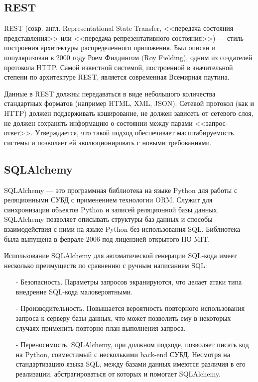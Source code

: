 \subsection{REST}

REST (сокр. англ. Representational State Transfer, <<передача состояния представления>> или <<передача репрезентативного состояния>>) --- стиль построения архитектуры распределенного приложения. 
Был описан и популяризован в 2000 году Роем Филдингом (Roy Fielding), одним из создателей протокола HTTP. 
Самой известной системой, построенной в значительной степени по архитектуре REST, является современная Всемирная паутина.

Данные в REST должны передаваться в виде небольшого количества стандартных форматов (например HTML, XML, JSON). 
Сетевой протокол (как и HTTP) должен поддерживать кэширование, не должен зависеть от сетевого слоя, не должен сохранять информацию о состоянии между парами <<запрос-ответ>>. 
Утверждается, что такой подход обеспечивает масштабируемость системы и позволяет ей эволюционировать с новыми требованиями.

\subsection{SQLAlchemy}

SQLAlchemy --- это программная библиотека на языке Python для работы с реляционными СУБД с применением технологии ORM.
Служит для синхронизации объектов Python и записей реляционной базы данных. 
SQLAlchemy позволяет описывать структуры баз данных и способы взаимодействия с ними на языке Python без использования SQL. 
Библиотека была выпущена в феврале 2006 под лицензией открытого ПО MIT.

Использование SQLAlchemy для автоматической генерации SQL-кода имеет несколько преимуществ по сравнению с ручным написанием SQL:
\begin{itemize}
 \item [-] Безопасность. 
 Параметры запросов экранируются, что делает атаки типа внедрение SQL-кода маловероятными.
 \item [-] Производительность. 
 Повышается вероятность повторного использования запроса к серверу базы данных, что может позволить ему в некоторых случаях применить повторно план выполнения запроса.
 \item [-] Переносимость. 
 SQLAlchemy, при должном подходе, позволяет писать код на Python, совместимый с несколькими back-end СУБД.
 Несмотря на стандартизацию языка SQL, между базами данных имеются различия в его реализации, абстрагироваться от которых и помогает SQLAlchemy. \cite{sqlalchemy}
\end{itemize}

